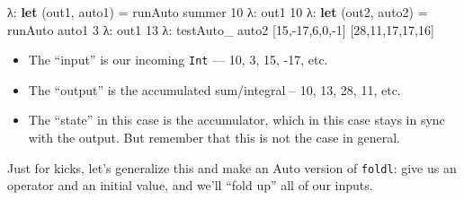 \documentclass[]{article}
\newenvironment{Shaded}{}{}
\newcommand{\KeywordTok}[1]{\textcolor[rgb]{0.00,0.44,0.13}{\textbf{{#1}}}}
\newcommand{\DataTypeTok}[1]{\textcolor[rgb]{0.56,0.13,0.00}{{#1}}}
\newcommand{\DecValTok}[1]{\textcolor[rgb]{0.25,0.63,0.44}{{#1}}}
\newcommand{\OtherTok}[1]{\textcolor[rgb]{0.00,0.44,0.13}{{#1}}}
\newcommand{\FunctionTok}[1]{\textcolor[rgb]{0.02,0.16,0.49}{{#1}}}
\newcommand{\NormalTok}[1]{{#1}}
\begin{document}
\begin{Shaded}
\end{Shaded}

\begin{Shaded}
\begin{Highlighting}[]
\NormalTok{λ}\FunctionTok{:} \KeywordTok{let} \NormalTok{(out1, auto1) }\FunctionTok{=} \NormalTok{runAuto summer }\DecValTok{10}
\NormalTok{λ}\FunctionTok{:} \NormalTok{out1}
\DecValTok{10}
\NormalTok{λ}\FunctionTok{:} \KeywordTok{let} \NormalTok{(out2, auto2) }\FunctionTok{=} \NormalTok{runAuto auto1 }\DecValTok{3}
\NormalTok{λ}\FunctionTok{:} \NormalTok{out1}
\DecValTok{13}
\NormalTok{λ}\FunctionTok{:} \NormalTok{testAuto_ auto2 [}\DecValTok{15}\NormalTok{,}\FunctionTok{-}\DecValTok{17}\NormalTok{,}\DecValTok{6}\NormalTok{,}\DecValTok{0}\NormalTok{,}\FunctionTok{-}\DecValTok{1}\NormalTok{]}
\NormalTok{[}\DecValTok{28}\NormalTok{,}\DecValTok{11}\NormalTok{,}\DecValTok{17}\NormalTok{,}\DecValTok{17}\NormalTok{,}\DecValTok{16}\NormalTok{]}
\end{Highlighting}
\end{Shaded}

\begin{itemize}
\tightlist
\item
  The ``input'' is our incoming \texttt{Int} --- 10, 3, 15, -17, etc.
\item
  The ``output'' is the accumulated sum/integral -- 10, 13, 28, 11, etc.
\item
  The ``state'' in this case is the accumulator, which in this case stays in sync with the output.
  But remember that this is not the case in general.
\end{itemize}

Just for kicks, let's generalize this and make an Auto version of \texttt{foldl}: give us an
operator and an initial value, and we'll ``fold up'' all of our inputs.
\end{document}
